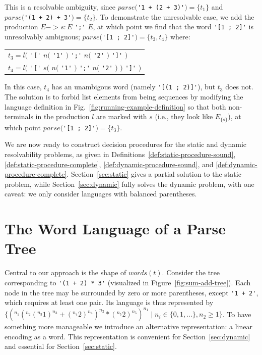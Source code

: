 \documentclass[runningheads]{llncs}
\newcommand{\parse}{\mathit{parse}} %
\newcommand{\words}{\mathit{words}} %
\begin{document}
\noindent This is a resolvable ambiguity, since $\parse($\verb|'1 + (2 + 3)'|$) = \{t_1\}$ and \\$\parse($\verb|'(1 + 2) + 3'|$) = \{t_2\}$. To demonstrate the unresolvable case, we add the production $E -> s: E$ \verb|';'| $E$, at which point we find that the word \verb|'[1 ; 2]'| is unresolvably ambiguous; $\parse($\verb|'[1 ; 2]'|$) = \{t_3, t_4\}$ where:

\begin{center}
  \begin{tabular}{l}
    $t_3 = l($ \verb|'['| \hphantom{$s($} $n($ \verb|'1'| $)$ \verb|';'| $n($ \verb|'2'| $)$ \hphantom{$)$} \verb|']'| $)$ \\
    $t_4 = l($ \verb|'['| $s($ $n($ \verb|'1'| $)$ \verb|';'| $n($ \verb|'2'| $)$ $)$ \verb|']'| $)$ \\
  \end{tabular}
\end{center}

\noindent In this case, $t_4$ has an unambigous word (namely \verb|'[(1 ; 2)]'|), but $t_3$ does not. The solution is to forbid list elements from being sequences by modifying the language definition in Fig.~\ref{fig:running-example-definition} so that both non-terminals in the production $l$ are marked with $s$ (i.e., they look like $E_{\{s\}}$), at which point $\parse($\verb|'[1 ; 2]'|$) = \{t_3\}$.

We are now ready to construct decision procedures for the static and dynamic resolvability problems, as given in Definitions~\ref{def:static-procedure-sound}, \ref{def:static-procedure-complete}, \ref{def:dynamic-procedure-sound}, and \ref{def:dynamic-procedure-complete}. Section~\ref{sec:static} gives a partial solution to the static problem, while Section~\ref{sec:dynamic} fully solves the dynamic problem, with one caveat: we only consider languages with balanced parentheses.

\section{The Word Language of a Parse Tree} \label{sec:linear-encoding}

Central to our approach is the shape of $\words(t)$. Consider the tree corresponding to \verb|'(1 + 2) * 3'| (visualized in Figure~\ref{fig:sum-add-tree}). Each node in the tree may be surrounded by zero or more parentheses, except \verb|'1 + 2'|, which requires at least one pair. Its language is thus represented by $\{(^{n_1}(^{n_2}(^{n_3}1)^{n_3} + (^{n_4}2)^{n_4})^{n_2} * (^{n_5}2)^{n_5})^{n_1} \mid n_i \in \{0, 1, \ldots\}, n_2 \geq 1\}$. To have something more manageable we introduce an alternative representation: a linear encoding as a word. This representation is convenient for Section~\ref{sec:dynamic} and essential for Section~\ref{sec:static}.
\end{document}
